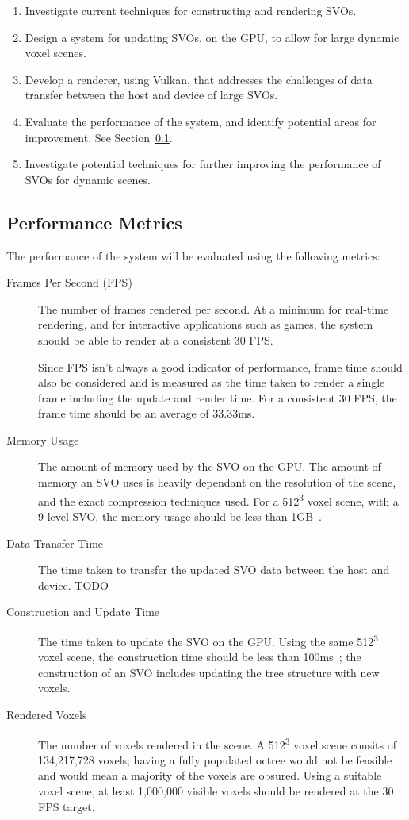 \begin{enumerate}
    \item Investigate current techniques for constructing and rendering SVOs.
    \item Design a system for updating SVOs, on the GPU, to allow for large dynamic voxel scenes.
    \item Develop a renderer, using Vulkan, that addresses the challenges of data transfer between the host and device of large SVOs.
    \item Evaluate the performance of the system, and identify potential areas for improvement. See Section~\ref{sec:performance_metrics}.
    \item Investigate potential techniques for further improving the performance of SVOs for dynamic scenes.
\end{enumerate}

\subsection{Performance Metrics} \label{sec:performance_metrics}
The performance of the system will be evaluated using the following metrics:

\begin{description}
    \item[Frames Per Second (FPS)] The number of frames rendered per second. At a minimum for real-time rendering, and for
        interactive applications such as games, the system should be able to render at a consistent 30 FPS.

        Since FPS isn't always a good indicator of performance, frame time should also be considered and is measured as the
        time taken to render a single frame including the update and render time. For a consistent 30 FPS, the frame time should
        be an average of 33.33ms.
    \item[Memory Usage] The amount of memory used by the SVO on the GPU. The amount of memory an SVO uses is heavily dependant
        on the resolution of the scene, and the exact compression techniques used. For a 512\textsuperscript{3} voxel scene,
        with a 9 level SVO, the memory usage should be less than 1GB~\cite{Crassin_2012,Laine_Karras_2010}.
    \item[Data Transfer Time] The time taken to transfer the updated SVO data between the host and device. TODO
    \item[Construction and Update Time] The time taken to update the SVO on the GPU. Using the same 512\textsuperscript{3} voxel
        scene, the construction time should be less than 100ms~\cite{Crassin_2012,Laine_Karras_2010}; the construction of
        an SVO includes updating the tree structure with new voxels.
    \item[Rendered Voxels] The number of voxels rendered in the scene. A 512\textsuperscript{3} voxel scene consits of
        134,217,728 voxels; having a fully populated octree would not be feasible and would mean a majority of the voxels are
        obsured. Using a suitable voxel scene, at least 1,000,000 visible voxels should be rendered at the 30 FPS target.
\end{description}


